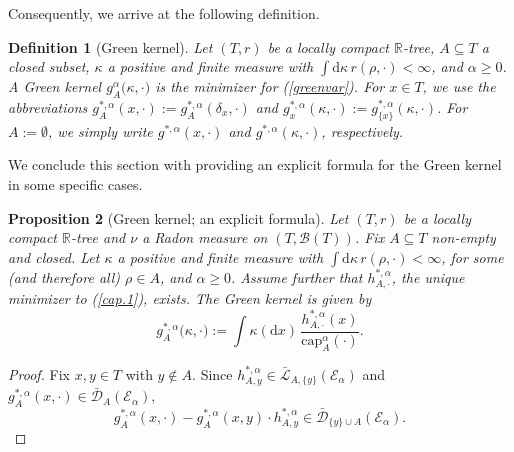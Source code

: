 \documentclass[11pt]{amsart}
\numberwithin{equation}{section}
\newtheorem{definition}{Definition}[section]
\newtheorem{proposition}[definition]{Proposition}
\begin{document}
{Consequently, we arrive at the following definition.
\begin{definition}[Green kernel] Let $(T,r)$ be a locally compact ${{\mathbb R}}$-tree,
$A\subseteq T$ a
closed subset,
$\kappa$ a positive and finite measure with $\int\mathrm{d}\kappa\,r({\rho},\boldsymbol{\cdot})<\infty$,
and $\alpha\ge 0$.
A {{\it} Green kernel}  $g_A^\alpha\big(\kappa,\boldsymbol{\cdot}\big)$ is the minimizer
for (\ref{greenvar}).
\label{Def:03}
For $x\in T$, we use the abbreviations $g^{\ast,\alpha}_A(x,\boldsymbol{\cdot}):=
g^{\ast,\alpha}_A(\delta_x,\boldsymbol{\cdot})$ and
$g^{\ast,\alpha}_x(\kappa,\boldsymbol{\cdot}):=g^{\ast,\alpha}_{\{x\}}(\kappa,\boldsymbol{\cdot})$.
{For $A:=\emptyset$, we simply write $g^{\ast,\alpha}(x,\boldsymbol{\cdot})$ and $g^{\ast,\alpha}(\kappa,\boldsymbol{\cdot})$, respectively.}
\end{definition}{\smallskip}

We conclude this section with providing an explicit formula for the Green kernel in some specific cases.
\begin{proposition}[Green kernel; an explicit formula]
{Let $(T,r)$ be a locally compact ${{\mathbb R}}$-tree and $\nu$ a {{\it} Radon measure} on $(T,{\mathcal B}(T))$.}
Fix $A\subseteq T$ non-empty and closed.    Let  $\kappa$ a positive and finite measure with $\int\mathrm{d}\kappa\,r({\rho},\boldsymbol{\cdot})<\infty$, for some (and therefore all) $\rho\in A$, and $\alpha\ge 0$. Assume further  that $h^{\ast,\alpha}_{A,\boldsymbol{\cdot}}$, the unique minimizer to (\ref{cap.1}), exists. The Green kernel is given by\label{P:06}
\begin{equation}\label{GBmin}
   g_A^{\ast,\alpha}\big(\kappa,\boldsymbol{\cdot}\big)
 :=
   \int\kappa(\mathrm{d}x)\,\frac{h^{\ast,\alpha}_{A,\boldsymbol{\cdot}}(x)}
   {\mathrm{cap}^\alpha_{A}(\boldsymbol{\cdot})}.
\end{equation}
\end{proposition}{\smallskip}

\begin{proof} Fix $x,y\in T$ with $y\not\in A$. Since
{$h_{A,y}^{\ast,\alpha}\in\bar{\mathcal L}_{A,\{y\}}(\mathcal E_\alpha)$ and ${g_A^{\ast,\alpha}(x,\boldsymbol{\cdot})}\in\bar{\mathcal D}_{A}(\mathcal E_\alpha)$},
\begin{equation}
\label{e:025}
   g_A^{\ast,\alpha}(x,\boldsymbol{\cdot})-g_A^{\ast,\alpha}(x,y)\cdot h_{A,y}^{\ast,\alpha}\in
\bar{\mathcal D}_{\{y\}\cup A}(\mathcal E_\alpha).
\end{equation}


\end{proof}}
\end{document}
